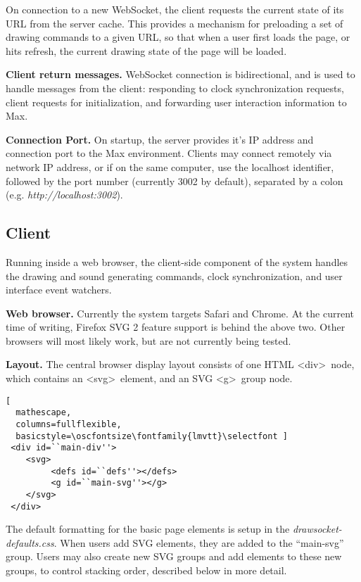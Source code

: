 On connection to a new WebSocket, the client requests the current state of its URL from the server cache.
This provides a mechanism for preloading a set of drawing commands to a given URL, so that when a user first loads the page, or hits refresh, the current drawing state of the page will be loaded.

\medskip
\noindent
\textbf{Client return messages.}
WebSocket connection is bidirectional, and is used to handle messages from the client: responding to clock synchronization requests, client requests for initialization, and forwarding user interaction information to Max.

\medskip
\noindent
\textbf{Connection Port.} 
On startup, the server provides it's IP address and connection port to the Max environment.
Clients may connect remotely via network IP address, or if on the same computer, use the localhost identifier, followed by the port number (currently 3002 by default), separated by a colon (e.g. \textit{http://localhost:3002}).
 
 \subsection{Client}  
Running inside a web browser, the client-side component of the \drawsocket system handles the drawing and sound generating commands, clock synchronization, and user interface event watchers.

\medskip
\noindent
\textbf{Web browser.}  
Currently the system targets Safari and Chrome.
At the current time of writing, Firefox SVG 2 feature support is behind the above two.
Other browsers will most likely work, but are not currently being tested. 

\medskip
\noindent
\textbf{Layout.}
The central browser display layout consists of one HTML \textless div\textgreater\ node, which contains an \textless svg\textgreater\ element, and an SVG \textless g\textgreater\ group node. 

\begin{lstlisting}[
  mathescape,
  columns=fullflexible,
  basicstyle=\oscfontsize\fontfamily{lmvtt}\selectfont ]
 <div id=``main-div''>
    <svg>
         <defs id=``defs''></defs>
         <g id=``main-svg''></g>
    </svg>
 </div>
\end{lstlisting}

The default formatting for the basic page elements is setup in the \textit{drawsocket-defaults.css}.
When users add SVG elements, they are added to the ``main-svg'' group.
Users may also create new SVG groups and add elements to these new groups, to control stacking order, described below in more detail.

